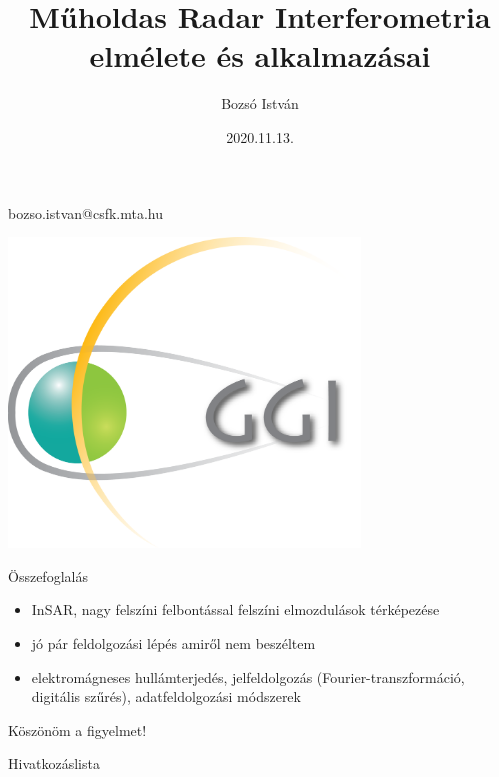 \documentclass[aspectratio=169]{beamer}
\title[Műholdas Távérzékelés Labor, 2019/20.I.]{Műholdas Radar Interferometria elmélete és alkalmazásai}
\author[Bozsó István]{Bozsó István}
\institute[ELKH CSFK GGI]{ELKH CSFK Geodéziai és Geofizikai Intézet}
\date{2020.11.13.}
\begin{document}
\begin{frame}
    \titlepage
    \begin{center}
        bozso.istvan@csfk.mta.hu \\
        \vspace{5pt}
        \begin{minipage}[c]{0.3\textwidth}
            \includegraphics[width=0.7\textwidth]{logos/ggi.png}
        \end{minipage}
    \end{center}
\end{frame}










\begin{frame}{Összefoglalás}
    \begin{itemize}
        \item InSAR, nagy felszíni felbontással felszíni elmozdulások térképezése
        \item jó pár feldolgozási lépés amiről nem beszéltem
        \item elektromágneses hullámterjedés, jelfeldolgozás (Fourier-transzformáció, digitális szűrés), adatfeldolgozási módszerek
    \end{itemize}
\end{frame}

\begin{frame}
    \begin{center}
        \Huge \color{blue!55!black}
        Köszönöm a figyelmet!
    \end{center}
\end{frame}

\begin{frame}[allowframebreaks]{Hivatkozáslista}
    
\end{frame}
\end{document}
